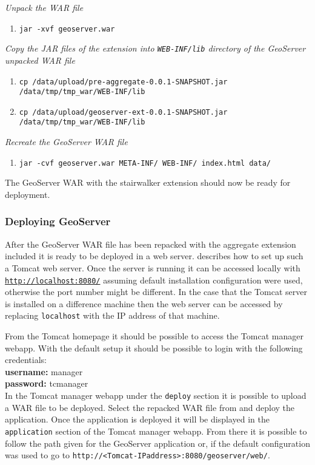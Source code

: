 \noindent \textit{Unpack the WAR file}
\begin{enumerate}
	\item \lstinline|jar -xvf geoserver.war|
\end{enumerate}
\textit{Copy the JAR files of the extension into \lstinline|WEB-INF/lib| directory of the GeoServer unpacked WAR file}
\begin{enumerate}[resume]
	\item \lstinline|cp /data/upload/pre-aggregate-0.0.1-SNAPSHOT.jar /data/tmp/tmp_war/WEB-INF/lib|
	\item \lstinline|cp /data/upload/geoserver-ext-0.0.1-SNAPSHOT.jar /data/tmp/tmp_war/WEB-INF/lib|
\end{enumerate}
\textit{Recreate the GeoServer WAR file}
\begin{enumerate}[resume]
	\item \lstinline|jar -cvf geoserver.war META-INF/ WEB-INF/ index.html data/|
\end{enumerate}
The GeoServer WAR with the stairwalker extension should now be ready for deployment.

\subsubsection{Deploying GeoServer}
\label{sec:geotomcat}
After the GeoServer WAR file has been repacked with the aggregate extension included it is ready to be deployed in a web server.  describes how to set up such a Tomcat web server. Once the server is running it can be accessed locally with \href{http://localhost:8080/}{\lstinline|http://localhost:8080/|} assuming default installation configuration were used, otherwise the port number might be different. In the case that the Tomcat server is installed on a difference machine then the web server can be accessed by replacing \lstinline|localhost| with the IP address of that machine.

From the Tomcat homepage it should be possible to access the Tomcat manager webapp. With the default setup it should be possible to login with the following credentials:\\
\indent \textbf{username:} manager \\
\indent \textbf{password:} tcmanager \\
In the Tomcat manager webapp under the \lstinline|deploy| section it is possible to upload a WAR file to be deployed. Select the repacked WAR file from  and deploy the application. Once the application is deployed it will be displayed in the \lstinline|application| section of the Tomcat manager webapp. From there it is possible to follow the path given for the GeoServer application or, if the default configuration was used to go to \mbox{\lstinline|http://<Tomcat-IPaddress>:8080/geoserver/web/|}.